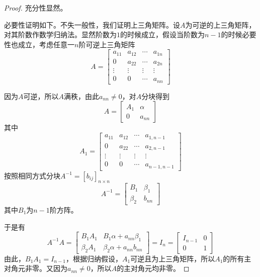 \begin{proof}
    \label{proof-triangle-matrix-inversable}
    充分性显然。

    必要性证明如下。不失一般性，我们证明上三角矩阵。设$A$为可逆的上三角矩阵，对其阶数作数学归纳法。显然阶数为$1$的时候成立，假设当阶数为$n-1$的时候必要性也成立，考虑任意一$n$阶可逆上三角矩阵
    \[
        A=\begin{bmatrix}
            a_{11}  &   a_{12}  &   \cdots  &   a_{1n} \\
            0       &   a_{22}  &   \cdots  &   a_{2n} \\
            \vdots  &   \vdots  &   \vdots  &   \vdots \\
            0       &   0       &   \cdots  &   a_{nn}
        \end{bmatrix}
    \]
    
    因为$A$可逆，所以$A$满秩，由此$a_{nn}\neq0$，对$A$分块得到
    \[
        A=\begin{bmatrix}
            A_1&\alpha\\0&a_{nn}
        \end{bmatrix}
    \]
    其中
    \[
        A_1=\begin{bmatrix}
            a_{11}  &   a_{12}  &   \cdots  &   a_{1,n-1} \\
            0       &   a_{22}  &   \cdots  &   a_{2,n-1} \\
            \vdots  &   \vdots  &   \vdots  &   \vdots \\
            0       &   0       &   \cdots  &   a_{n-1,n-1}
        \end{bmatrix}
    \]
    按照相同方式分块$A^{-1}=[b_{ij}]_{n\times n}$
    \[
        A^{-1}=\begin{bmatrix}
            B_1&\beta_1\\\beta_2&b_{nn}
        \end{bmatrix}
    \]
    其中$B_1$为$n-1$阶方阵。

    于是有
    \[
        A^{-1}A=\begin{bmatrix}
            B_1A_1 & B_1\alpha+a_{nn}\beta_1 \\
            \beta_2A_1 & \beta_2\alpha+a_{nn}b_{nn}
        \end{bmatrix}=I_n=\begin{bmatrix}
            I_{n-1} & 0 \\ 0 & 1
        \end{bmatrix}
    \]
    由此，$B_1A_1=I_{n-1}$，根据归纳假设，$A_1$可逆且为上三角矩阵，所以$A_1$的所有主对角元非零。又因为$a_{nn}\neq0$，所以$A$的主对角元均非零。
\end{proof}

